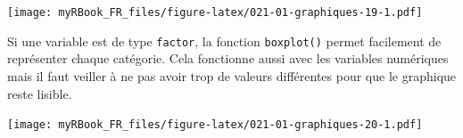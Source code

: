\documentclass[
]{book}
\newenvironment{Shaded}{\begin{snugshade}}{\end{snugshade}}
\newcommand{\CommentTok}[1]{\textcolor[rgb]{0.56,0.35,0.01}{\textit{#1}}}
\newcommand{\DataTypeTok}[1]{\textcolor[rgb]{0.13,0.29,0.53}{#1}}
\newcommand{\DecValTok}[1]{\textcolor[rgb]{0.00,0.00,0.81}{#1}}
\newcommand{\KeywordTok}[1]{\textcolor[rgb]{0.13,0.29,0.53}{\textbf{#1}}}
\newcommand{\NormalTok}[1]{#1}
\newcommand{\OperatorTok}[1]{\textcolor[rgb]{0.81,0.36,0.00}{\textbf{#1}}}
\newcommand{\OtherTok}[1]{\textcolor[rgb]{0.56,0.35,0.01}{#1}}
\newcommand{\StringTok}[1]{\textcolor[rgb]{0.31,0.60,0.02}{#1}}
\begin{document}
\texttt{[image: myRBook\_FR\_files/figure-latex/021-01-graphiques-19-1.pdf]}

Si une variable est de type \texttt{factor}, la fonction \texttt{boxplot()} permet facilement de représenter chaque catégorie. Cela fonctionne aussi avec les variables numériques mais il faut veiller à ne pas avoir trop de valeurs différentes pour que le graphique reste lisible.

\begin{Shaded}
\end{Shaded}

\texttt{[image: myRBook\_FR\_files/figure-latex/021-01-graphiques-20-1.pdf]}
\end{document}
